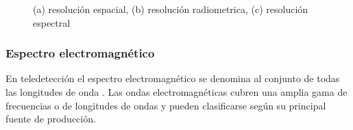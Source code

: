 \begin{figure}[htbp]
\centering
{}

\caption{(a) resolución espacial, (b) resolución radiometrica, (c) resolución espectral}\label{Fig:resoluciones}
\end{figure}


\subsubsection{Espectro electromagnético}

En teledetección el espectro electromagnético se denomina al conjunto de todas las longitudes de onda \citep{chuvieco}. Las ondas electromagnéticas cubren una amplia gama de frecuencias o de longitudes de ondas y pueden clasificarse según su principal fuente de producción. 

